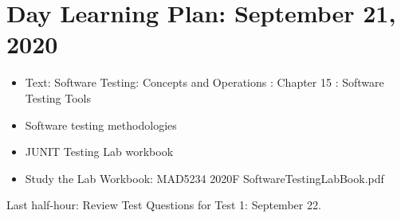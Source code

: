 \section{Day Learning Plan: September 21, 2020}

\begin{itemize}
    \item Text: Software Testing: Concepts and Operations : Chapter 15 : Software Testing Tools    
    \item Software testing methodologies
    \item JUNIT Testing Lab workbook
    \item Study the Lab Workbook: MAD5234 2020F SoftwareTestingLabBook.pdf
\end{itemize}

Last half-hour: Review Test Questions for Test 1: September 22.





 


 